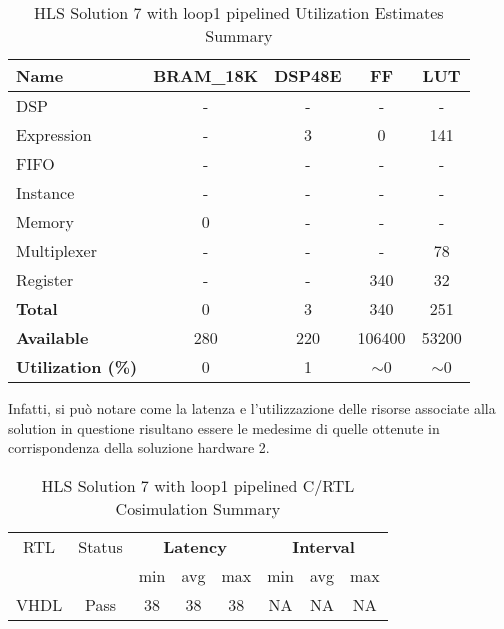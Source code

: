 \begin{table}[H]
	\centering
	\begin{tabular}{|l|c|c|c|c|}
		\hline
		\textbf{Name}    & \textbf{BRAM\_18K} & \textbf{DSP48E} & \textbf{FF} & \textbf{LUT} \\ \hline
		DSP              & -                   & -               & -           & -            \\ 
		Expression       & -                   & 3              & 0           & 141          \\ 
		FIFO             & -                   & -               & -           & -            \\ 
		Instance         & -                   & -               & -           & -            \\ 
		Memory           & 0                   & -               & -          & -            \\ 
		Multiplexer      & -                   & -               & -           & 78          \\ 
		Register         & -                   & -               & 340         & 32            \\ \hline
		\textbf{Total}   & 0                   & 3               & 340         & 251          \\ \hline
		\textbf{Available} & 280               & 220             & 106400      & 53200        \\ \hline
		\textbf{Utilization (\%)} & 0            & 1               & $\sim$0     & $\sim$0      \\ \hline
	\end{tabular}
	\caption{HLS Solution 7 with loop1 pipelined Utilization Estimates Summary}
	\label{tab:hls-solution-7-loop1-pipeline-utilization-estimates-summary}
\end{table}

Infatti, si può notare come la latenza e l'utilizzazione delle risorse associate alla solution in questione risultano essere le medesime di quelle ottenute in corrispondenza della soluzione hardware 2.

\begin{table}[H]
	\centering
	\begin{tabular}{|c|c|c|c|c|c|c|c|}
		\hline
		\multicolumn{1}{|c|}{RTL} & \multicolumn{1}{|c|}{Status} & \multicolumn{3}{c|}{\textbf{Latency}} & \multicolumn{3}{c|}{\textbf{Interval}} \\
		&  & min & avg & max & min & avg & max \\
		\hline
		VHDL & Pass & 38 & 38 & 38 & NA & NA & NA \\
		\hline
	\end{tabular}
	\caption{HLS Solution 7 with loop1 pipelined C/RTL Cosimulation Summary }
	\label{tab:hls-solution-7-loop1-pipeline-cosimulation-summary}
\end{table}

